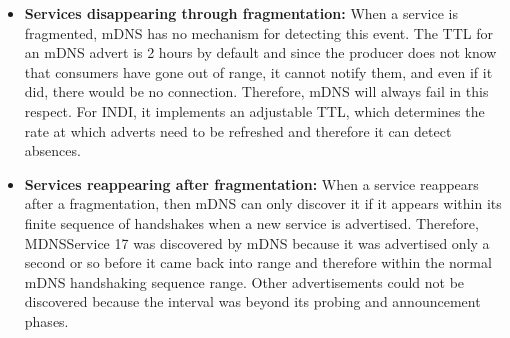 \begin{itemize}
\item \textbf{Services disappearing through fragmentation:} When a service is fragmented, mDNS has no mechanism for detecting this event. The TTL for an mDNS advert is 2 hours by default and since the producer does not know that consumers have gone out of range, it cannot notify them, and even if it did, there would be no connection.   Therefore, mDNS will always fail in this respect.  For INDI, it implements an adjustable TTL, which determines the rate at which adverts need to be refreshed and therefore it can detect absences.

\item \textbf{Services reappearing after fragmentation:} When a service reappears after a fragmentation, then mDNS can only discover it if it appears within its finite sequence of handshakes when a new service is advertised.  Therefore, MDNSService 17 was discovered by mDNS because it was advertised only a second or so before it came back into range and therefore within the normal mDNS handshaking sequence range.  Other advertisements could not be discovered because the interval was beyond its probing and announcement phases. 
\end{itemize}
 
